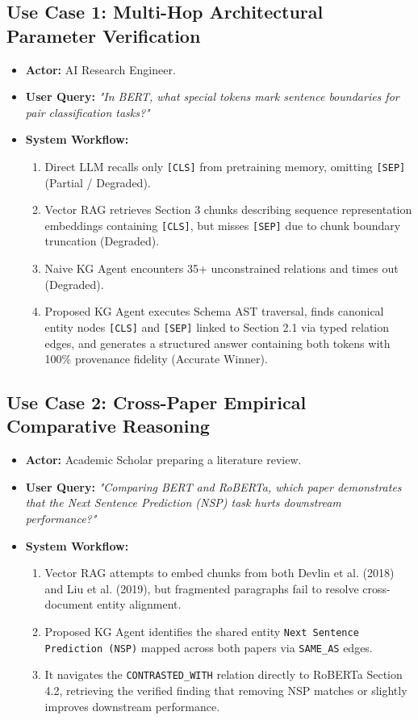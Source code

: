 \subsection{Use Case 1: Multi-Hop Architectural Parameter Verification}
\begin{itemize}
    \item \textbf{Actor:} AI Research Engineer.
    \item \textbf{User Query:} \textit{"In BERT, what special tokens mark sentence boundaries for pair classification tasks?"}
    \item \textbf{System Workflow:}
    \begin{enumerate}
        \item Direct LLM recalls only \texttt{[CLS]} from pretraining memory, omitting \texttt{[SEP]} (Partial / Degraded).
        \item Vector RAG retrieves Section 3 chunks describing sequence representation embeddings containing \texttt{[CLS]}, but misses \texttt{[SEP]} due to chunk boundary truncation (Degraded).
        \item Naive KG Agent encounters 35+ unconstrained relations and times out (Degraded).
        \item Proposed KG Agent executes Schema AST traversal, finds canonical entity nodes \texttt{[CLS]} and \texttt{[SEP]} linked to Section 2.1 via typed relation edges, and generates a structured answer containing both tokens with 100\% provenance fidelity (Accurate Winner).
    \end{enumerate}
\end{itemize}

\subsection{Use Case 2: Cross-Paper Empirical Comparative Reasoning}
\begin{itemize}
    \item \textbf{Actor:} Academic Scholar preparing a literature review.
    \item \textbf{User Query:} \textit{"Comparing BERT and RoBERTa, which paper demonstrates that the Next Sentence Prediction (NSP) task hurts downstream performance?"}
    \item \textbf{System Workflow:}
    \begin{enumerate}
        \item Vector RAG attempts to embed chunks from both Devlin et al. (2018) and Liu et al. (2019), but fragmented paragraphs fail to resolve cross-document entity alignment.
        \item Proposed KG Agent identifies the shared entity \texttt{Next Sentence Prediction (NSP)} mapped across both papers via \texttt{SAME\_AS} edges.
        \item It navigates the \texttt{CONTRASTED\_WITH} relation directly to RoBERTa Section 4.2, retrieving the verified finding that removing NSP matches or slightly improves downstream performance.
    \end{enumerate}
\end{itemize}

